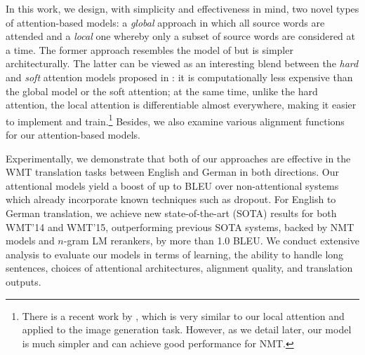 In this work, we design, with simplicity and effectiveness in mind, two novel
types of attention-based models: a {\it global} approach in which all source
words are attended and a {\it local} one whereby only a subset of source words
are considered at a time. The former approach resembles the model of
\cite{bog15} but is simpler architecturally. The latter can be viewed as an
interesting blend between the {\it hard} and {\it soft} attention models
proposed in \cite{xu15}: it is computationally less expensive than the
global model or the soft attention; at the same time, unlike the hard attention,
the local attention is
differentiable almost everywhere, making it easier to implement and
train.\footnote{There is a recent work by , which is very
similar to our local attention and applied to the image generation task.
However, as we detail later, our model is much simpler and can achieve good performance for NMT.} Besides, we also examine various
alignment functions for our attention-based models.

Experimentally, we demonstrate that both of our approaches are
effective in the WMT translation tasks between English and German in  both
directions. Our attentional models yield a boost of up to \attngain{} BLEU over
non-attentional systems which already incorporate known techniques such as
dropout. For English to German translation, we achieve new state-of-the-art
(SOTA)
results for both WMT'14 and WMT'15, outperforming previous SOTA systems, backed by
NMT models and $n$-gram LM rerankers, by more than 1.0 BLEU. We conduct
extensive analysis to evaluate our models in terms of learning, the ability to
handle long sentences, choices of attentional architectures, alignment quality, and translation
outputs. 
